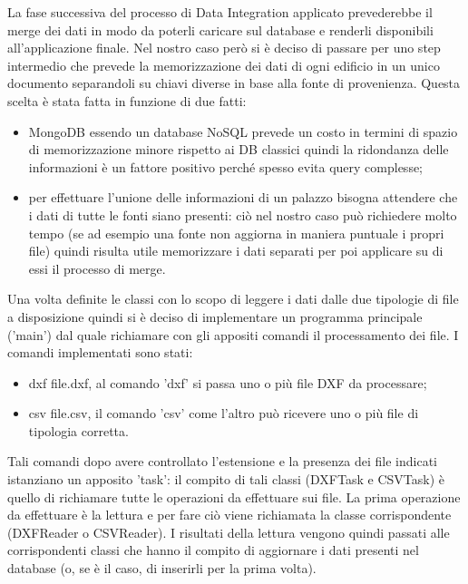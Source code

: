\documentclass[12pt]{report}
\begin{document}
La fase successiva del processo di Data Integration applicato prevederebbe il merge dei dati in modo da poterli caricare sul database e renderli disponibili all'applicazione finale.
Nel nostro caso però si è deciso di passare per uno step intermedio che prevede la memorizzazione dei dati di ogni edificio in un unico documento separandoli su chiavi diverse in base alla fonte di provenienza.
Questa scelta è stata fatta in funzione di due fatti:
\begin{itemize}
\item MongoDB essendo un database NoSQL prevede un costo in termini di spazio di memorizzazione minore rispetto ai DB classici quindi la ridondanza delle informazioni è un fattore positivo perché spesso evita query complesse;
\item per effettuare l'unione delle informazioni di un palazzo bisogna attendere che i dati di tutte le fonti siano presenti: ciò nel nostro caso può richiedere molto tempo (se ad esempio una fonte non aggiorna in maniera puntuale i propri file) quindi risulta utile memorizzare i dati separati per poi applicare su di essi il processo di merge.     
\end{itemize}

\vspace{5mm} %

Una volta definite le classi con lo scopo di leggere i dati dalle due tipologie di file a disposizione quindi si è deciso di implementare un programma principale ('main') dal quale richiamare con gli appositi comandi il processamento dei file.
I comandi implementati sono stati:
\begin{itemize}
\item dxf file.dxf, al comando 'dxf' si passa uno o più file DXF da processare;
\item csv file.csv, il comando 'csv' come l'altro può ricevere uno o più file di tipologia corretta. 
\end{itemize}

Tali comandi dopo avere controllato l'estensione e la presenza dei file indicati istanziano un apposito 'task': il compito di tali classi (DXFTask e CSVTask) è quello di richiamare tutte le operazioni da effettuare sui file.
La prima operazione da effettuare è la lettura e per fare ciò viene richiamata la classe corrispondente (DXFReader o CSVReader). 
I risultati della lettura vengono quindi passati alle corrispondenti classi che hanno il compito di aggiornare i dati presenti nel database (o, se è il caso, di inserirli per la prima volta). 
\end{document}

